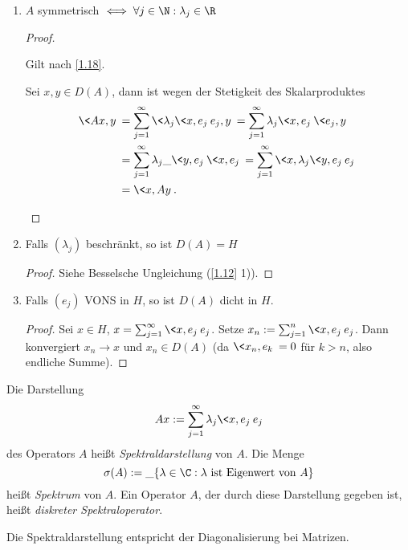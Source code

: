 \documentclass{mycourse}
\begin{document}
\begin{ex}
\begin{enumerate}[1)]
\begin{enumerate}[a)]
\begin{proof}
\[						\]
					\end{proof}
			\end{enumerate}
		\item
			$A$ symmetrisch $\iff \forall j \in \N : \lambda_j \in \R$
			\begin{proof}
				\begin{seg}[$\implies$]
					Gilt nach \ref{1.18}.
				\end{seg}
				\begin{seg}[$\Longleftarrow$]
					Sei $x,y \in D(A)$, dann ist wegen der Stetigkeit des Skalarproduktes
					\begin{align*}
						\<Ax,y\>
						&= \sum_{j=1}^\infty \<\lambda_j \<x,e_j\> e_j, y\> 
						= \sum_{j=1}^\infty \lambda_j \<x,e_j\> \<e_j, y\> \\
						&= \sum_{j=1}^\infty \lambda_j \_{\<y,e_j\>} \<x, e_j\> 
						= \sum_{j=1}^\infty \<x,\lambda_j \<y,e_j\> e_j\> \\
						&= \<x, Ay\>.
					\end{align*}
				\end{seg}
			\end{proof}
		\item
			Falls $(\lambda_j)$ beschränkt, so ist $D(A) = H$
			\begin{proof}
				Siehe Besselsche Ungleichung (\ref{1.12} 1)).
			\end{proof}
		\item
			Falls $(e_j)$ VONS in $H$, so ist $D(A)$ dicht in $H$.
			\begin{proof}
				Sei $x \in H$, $x = \sum_{j=1}^\infty \<x,e_j\> e_j$.
				Setze $x_n := \sum_{j=1}^n \<x,e_j\> e_j$.
				Dann konvergiert $x_n \to x$ und $x_n \in D(A)$ (da $\<x_n,e_k\> = 0$ für $k > n$, also endliche Summe).
			\end{proof}
	\end{enumerate}
\end{ex}

\begin{df} \label{1.20}
	Die Darstellung 
	\[
		Ax := \sum_{j=1}^\infty \lambda_j \<x,e_j\> e_j
	\]
	des Operators $A$ heißt \emph{Spektraldarstellung} von $A$.
	Die Menge
	\[
		\sigma(A) := \_{\{\lambda \in \C : \lambda \text{ ist Eigenwert von $A$} \}}
	\]
	heißt \emph{Spektrum} von $A$.
	Ein Operator $A$, der durch diese Darstellung gegeben ist, heißt \emph{diskreter Spektraloperator}.
	\begin{note}
		Die Spektraldarstellung entspricht der Diagonalisierung bei Matrizen.
	\end{note}
\end{df}
\end{document}
